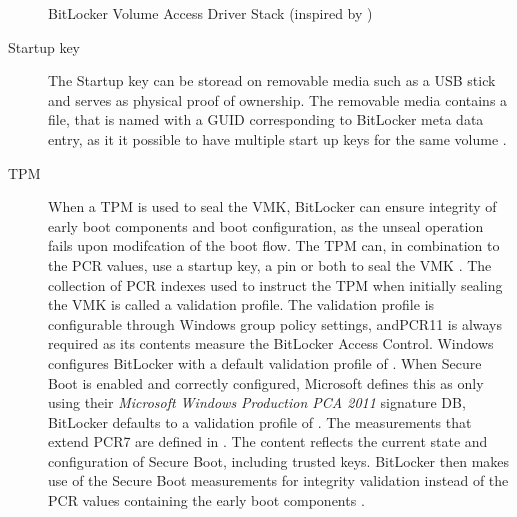 \begin{figure}[htb]%
    \centering
    
    \caption{BitLocker Volume Access Driver Stack (inspired by \cite[Figure 9-24]{windows-internals-6-part2})}%
    \label{fig:bitlocker-volume-access-driver-stack}%
\end{figure}

\begin{description}
    \item[Startup key] The Startup key can be storead on removable media such as a \ac{USB} stick and serves as physical proof of ownership.
        The removable media contains a  file, that is named with a \ac{GUID} corresponding to BitLocker meta data entry, as it it possible to have multiple start up keys for the same volume \cite[Section 2.6]{bde-format-spec}\cite{microsoft-windows-prepare-your-org}.

    \item[TPM]
        When a \ac{TPM} is used to seal the \ac{VMK}, BitLocker can ensure integrity of early boot components and boot configuration, as the unseal operation fails upon modifcation of the boot flow.
        The \ac{TPM} can, in combination to the \ac{PCR} values, use a startup key, a pin or both to seal the \ac{VMK} \cite{microsoft-bitlocker-countermeasures}.
        The collection of \ac{PCR} indexes used to instruct the \ac{TPM} when initially sealing the \ac{VMK} is called a validation profile.
        The validation profile is configurable through Windows group policy settings, and\ac{PCR}11 is always required as its contents measure the BitLocker Access Control.
        Windows configures BitLocker with a default validation profile of  \cite{microsoft-windows-bitlocker-group-policy-settings}.
        When Secure Boot is enabled and correctly configured, Microsoft defines this as only using their \emph{Microsoft Windows Production PCA 2011} signature \ac{DB}, BitLocker defaults to a validation profile of  \cite{microsoft-pcr7-binding}.
        The measurements that extend \ac{PCR}7 are defined in \cite{microsoft-trusted-execution-environment}.
        The content reflects the current state and configuration of Secure Boot, including trusted keys.
        BitLocker then makes use of the Secure Boot measurements for integrity validation instead of the \ac{PCR} values containing the early boot components \cite{microsoft-windows-bitlocker-group-policy-settings}.


\end{description}
